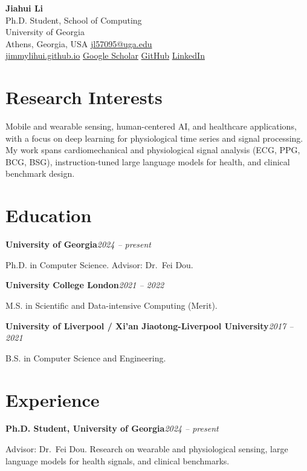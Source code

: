 \documentclass[10pt,a4paper]{article}
\newcommand{\entry}[2]{%
  \noindent\textbf{#1}\hfill\textit{\small #2}\par\vspace{0.15em}}
\begin{document}
\begin{center}
  {\Huge\bfseries\color{darkink} Jiahui Li}\\[0.45em]
  {\large Ph.D. Student, School of Computing}\\[0.2em]
  {\large University of Georgia}\\[0.55em]
  \small
  Athens, Georgia, USA \quad\textbar\quad
  \href{mailto:jl57095@uga.edu}{jl57095@uga.edu}\\[0.25em]
  \href{https://jimmylihui.github.io}{jimmylihui.github.io} \quad\textbar\quad
  \href{https://scholar.google.com/citations?user=CGnz6VQAAAAJ&hl=en}{Google Scholar} \quad\textbar\quad
  \href{https://github.com/jimmylihui}{GitHub} \quad\textbar\quad
  \href{https://www.linkedin.com/in/jiahui-li-942200254}{LinkedIn}
\end{center}
\vspace{0.3em}

\section{Research Interests}
Mobile and wearable sensing, human-centered AI, and healthcare applications, with a focus on deep
learning for physiological time series and signal processing. My work spans cardiomechanical and
physiological signal analysis (ECG, PPG, BCG, BSG), instruction-tuned large language models for
health, and clinical benchmark design.

\section{Education}
\entry{University of Georgia}{2024 -- present}
Ph.D. in Computer Science. Advisor: Dr.\ Fei Dou.
\vspace{0.35em}

\entry{University College London}{2021 -- 2022}
M.S. in Scientific and Data-intensive Computing (Merit).
\vspace{0.35em}

\entry{University of Liverpool / Xi'an Jiaotong-Liverpool University}{2017 -- 2021}
B.S. in Computer Science and Engineering.

\section{Experience}
\entry{Ph.D. Student, University of Georgia}{2024 -- present}
\vspace{0.1em}
Advisor: Dr.\ Fei Dou. Research on wearable and physiological sensing, large language models for
health signals, and clinical benchmarks.
\vspace{0.35em}
\end{document}
